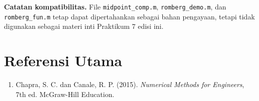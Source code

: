 \documentclass[book,english,noindex,lean,nobackpage,nocopyright,noupdate,nofiglist,notablist]{enacom}
\begin{document}
\noindent\textbf{Catatan kompatibilitas.} File \texttt{midpoint\_comp.m}, \texttt{romberg\_demo.m}, dan \texttt{romberg\_fun.m} tetap dapat dipertahankan sebagai bahan pengayaan, tetapi tidak digunakan sebagai materi inti Praktikum 7 edisi ini.


\chapter*{Referensi Utama}
\begin{enumerate}
\item Chapra, S. C. dan Canale, R. P. (2015). \textit{Numerical Methods for Engineers}, 7th ed. McGraw-Hill Education.
\end{enumerate}
\end{document}
